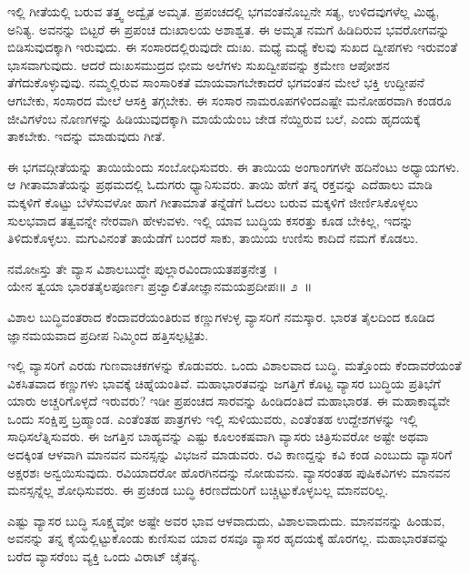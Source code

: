 ಇಲ್ಲಿ ಗೀತೆಯಲ್ಲಿ ಬರುವ ತತ್ತ್ವ ಅದ್ವೈತ ಅಮೃತ. ಪ್ರಪಂಚದಲ್ಲಿ ಭಗವಂತನೊಬ್ಬನೇ ಸತ್ಯ, ಉಳಿದವುಗಳೆಲ್ಲ ಮಿಥ್ಯ, ಅನಿತ್ಯ. ಅವನನ್ನು ಬಿಟ್ಟರೆ ಈ ಪ್ರಪಂಚ ದುಃಖಾಲಯ ಅಶಾಶ್ವತ. ಈ ಅಮೃತ ನಮಗೆ ಹಿಡಿದಿರುವ ಭವರೋಗವನ್ನು ಬಿಡಿಸುವುದಕ್ಕಾಗಿ ಇರುವುದು. ಈ ಸಂಸಾರದಲ್ಲಿರುವುದೇ ದುಃಖ. ಮಧ್ಯೆ ಮಧ್ಯೆ ಕೆಲವು ಸುಖದ ದ್ವೀಪಗಳು ಇರುವಂತೆ ಭಾಸವಾಗುವುದು. ಆದರೆ ದುಃಖಸಮುದ್ರದ ಭೀಮ ಅಲೆಗಳು ಸುಖದ್ವೀಪವನ್ನು ಕ್ರಮೇಣ ಆಪೋಶನ ತೆಗೆದುಕೊಳ್ಳುವುವು. ನಮ್ಮಲ್ಲಿರುವ ಸಾಂಸಾರಿಕತೆ ಮಾಯವಾಗಬೇಕಾದರೆ ಭಗವಂತನ ಮೇಲೆ ಭಕ್ತಿ ಉದ್ದೀಪನೆ ಆಗಬೇಕು, ಸಂಸಾರದ ಮೇಲೆ ಆಸಕ್ತಿ ತಗ್ಗಬೇಕು. ಈ ಸಂಸಾರ ನಾಮರೂಪಗಳಿಂದ\break ಎಷ್ಟೇ ಮನೋಹರವಾಗಿ ಕಂಡರೂ ಜೀವಿಗಳೆಂಬ ನೊಣಗಳನ್ನು ಹಿಡಿಯುವುದಕ್ಕಾಗಿ ಮಾಯೆ\-ಯೆಂಬ ಜೇಡ ನೆಯ್ದಿರುವ ಬಲೆ, ಎಂದು ಹೃದಯಕ್ಕೆ ತಾಕಬೇಕು. ಇದನ್ನು ಮಾಡುವುದು ಗೀತೆ.

ಈ ಭಗವದ್ಗೀತೆಯನ್ನು ತಾಯಿಯೆಂದು ಸಂಬೋಧಿಸುವರು. ಈ ತಾಯಿಯ ಅಂಗಾಂಗಗಳೇ ಹದಿನೆಂಟು ಅಧ್ಯಾಯಗಳು. ಆ ಗೀತಾಮಾತೆಯನ್ನು ಪ್ರಥಮದಲ್ಲಿ ಓದುಗರು ಧ್ಯಾನಿಸುವರು. ತಾಯಿ ಹೇಗೆ ತನ್ನ ರಕ್ತವನ್ನು ಎದೆಹಾಲು ಮಾಡಿ ಮಕ್ಕಳಿಗೆ ಕೊಟ್ಟು ಬೆಳೆಸುವಳೋ ಹಾಗೆ ಗೀತಾಮಾತೆ ತನ್ನೆಡೆಗೆ ಓದಲು ಬರುವ ಮಕ್ಕಳಿಗೆ ಜೀರ್ಣಿಸಿಕೊಳ್ಳಲು ಸುಲಭವಾದ ತತ್ವವನ್ನೇ ನೇರವಾಗಿ ಹೇಳುವಳು. ಇಲ್ಲಿ ಯಾವ ಬುದ್ಧಿಯ ಕಸರತ್ತು ಕೂಡ ಬೇಕಿಲ್ಲ, ಇದನ್ನು ತಿಳಿದುಕೊಳ್ಳಲು. ಮಗುವಿನಂತೆ ತಾಯೆಡೆಗೆ ಬಂದರೆ ಸಾಕು, ತಾಯಿಯ ಉಣಿಸು ಕಾದಿದೆ ನಮಗೆ ಕೊಡಲು.

\begin{shloka}
ನಮೋsಸ್ತು ತೇ ವ್ಯಾಸ ವಿಶಾಲಬುದ್ಧೇ ಪುಲ್ಲಾರವಿಂದಾಯತಪತ್ರನೇತ್ರ~।\\ಯೇನ ತ್ವಯಾ ಭಾರತತೈಲಪೂರ್ಣಃ ಪ್ರಜ್ವಾಲಿತೋ\hfill\break ಜ್ಞಾನಮಯಪ್ರದೀಪಃ\hfill॥ ೨~॥
\end{shloka}

\begin{artha}
ವಿಶಾಲ ಬುದ್ಧಿವಂತರಾದ ಕೆಂದಾವರೆಯಂತಿರುವ ಕಣ್ಣುಗಳುಳ್ಳ ವ್ಯಾಸರಿಗೆ ನಮಸ್ಕಾರ. ಭಾರತ ತೈಲದಿಂದ ಕೂಡಿದ ಜ್ಞಾನಮಯವಾದ ಪ್ರದೀಪ ನಿಮ್ಮಿಂದ ಹತ್ತಿಸಲ್ಪಟ್ಟಿತು.
\end{artha}

ಇಲ್ಲಿ ವ್ಯಾಸರಿಗೆ ಎರಡು ಗುಣವಾಚಕಗಳನ್ನು ಕೊಡುವರು. ಒಂದು ವಿಶಾಲವಾದ ಬುದ್ಧಿ. ಮತ್ತೊಂದು ಕೆಂದಾವರೆಯಂತೆ ವಿಕಸಿತವಾದ ಕಣ್ಣುಗಳು ಭಾವಕ್ಕೆ ಚಿಹ್ನೆಯಂತಿವೆ. ಮಹಾಭಾರತವನ್ನು ಜಗತ್ತಿಗೆ ಕೊಟ್ಟ ವ್ಯಾಸರ ಬುದ್ಧಿಯ ಪ್ರತಿಭೆಗೆ ಯಾರು ಅಚ್ಚರಿಗೊಳ್ಳದೆ ಇರುವರು? ಇಡೀ ಪ್ರಪಂಚದ ಸಾರವನ್ನು ಹಿಂಡಿದಂತಿದೆ ಮಹಾಭಾರತ. ಈ ಮಹಾಕಾವ್ಯವೇ ಒಂದು ಸಂಕ್ಷಿಪ್ತ ಬ್ರಹ್ಮಾಂಡ. ಎಂತೆಂತಹ ಪಾತ್ರಗಳು ಇಲ್ಲಿ ಸುಳಿಯುವರು, ಎಂತೆಂತಹ ಉದ್ದೇಶಗಳನ್ನು ಇಲ್ಲಿ ಸಾಧಿಸಲೆತ್ನಿಸುವರು. ಈ ಜಗತ್ತಿನ ಬಾಹ್ಯವನ್ನು ಎಷ್ಟು ಕೂಲಂಕಷವಾಗಿ ವ್ಯಾಸರು ಚಿತ್ರಿಸುವರೋ ಅಷ್ಟೇ ಅಥವಾ ಅದಕ್ಕಿಂತ ಆಳವಾಗಿ ಮಾನವನ ಮನಸ್ಸನ್ನು ವಿಭಜನೆ ಮಾಡುವರು. ರವಿ ಕಾಣದ್ದನ್ನು ಕವಿ ಕಂಡ ಎಂಬುದು ವ್ಯಾಸರಿಗೆ ಅಕ್ಷರಶಃ ಅನ್ವಯಿಸುವುದು. ರವಿಯಾದರೋ ಹೊರಗಿನದನ್ನು ನೋಡುವನು. ವ್ಯಾಸರಂತಹ ಪುಷಿಕವಿಗಳು ಮಾನವನ ಮನಸ್ಸನ್ನೆಲ್ಲ ಶೋಧಿಸುವರು. ಈ ಪ್ರಚಂಡ ಬುದ್ಧಿ ಕಿರಣದೆದುರಿಗೆ ಬಚ್ಚಿಟ್ಟುಕೊಳ್ಳಬಲ್ಲ ಮಾನವರಿಲ್ಲ.

ಎಷ್ಟು ವ್ಯಾಸರ ಬುದ್ಧಿ ಸೂಕ್ಷ್ಮವೋ ಅಷ್ಟೇ ಅವರ ಭಾವ ಆಳವಾದುದು, ವಿಶಾಲವಾದುದು. ಮಾನವನನ್ನು ಹಿಂಡುವ, ಅವನನ್ನು ತನ್ನ ಕೈಯಲ್ಲಿಟ್ಟುಕೊಂಡು ಕುಣಿಸುವ ಯಾವ ರಸವೂ ವ್ಯಾಸರ ಹೃದಯಕ್ಕೆ ಹೊರಗಲ್ಲ. ಮಹಾಭಾರತವನ್ನು ಬರೆದ ವ್ಯಾಸರೆಂಬ ವ್ಯಕ್ತಿ ಒಂದು ವಿರಾಟ್ ಚೈತನ್ಯ.

